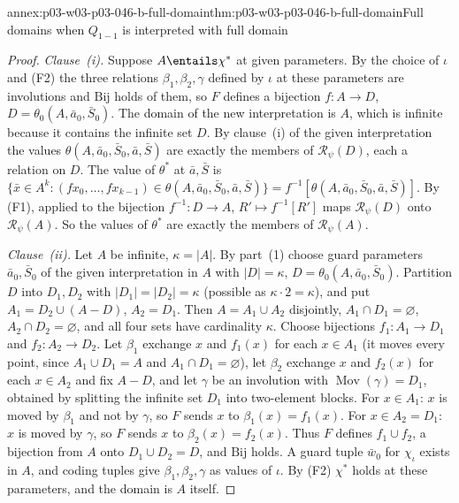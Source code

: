 \begin{annexitem}{annex:p03-w03-p03-046-b-full-domain}{thm:p03-w03-p03-046-b-full-domain}{Full domains when \(Q_{1-1}\) is interpreted with full domain}
\begin{proof}
\emph{Clause~(i).} Suppose \(A\entails\chi^*\) at given parameters. By
the choice of \(\iota\) and (F2) the three relations
\(\beta_1,\beta_2,\gamma\) defined by \(\iota\) at these parameters are
involutions and \(\mathrm{Bij}\) holds of them, so \(F\) defines a bijection
\(f\colon A\to D\), \(D=\theta_0(A,\bar a_0,\bar S_0)\). The domain of the
new interpretation is \(A\), which is infinite because it contains the
infinite set \(D\). By clause~(i) of the given interpretation the values
\(\theta(A,\bar a_0,\bar S_0,\bar a,\bar S)\) are exactly the members of
\(\mathscr R_\psi(D)\), each a relation on \(D\). The value of
\(\theta^*\) at \(\bar a,\bar S\) is
\(\{\bar x\in A^k:(fx_0,\dots,fx_{k-1})\in\theta(A,\bar a_0,\bar S_0,\bar
a,\bar S)\}=f^{-1}[\theta(A,\bar a_0,\bar S_0,\bar a,\bar S)]\). By (F1),
applied to the bijection \(f^{-1}\colon D\to A\), \(R'\mapsto f^{-1}[R']\)
maps \(\mathscr R_\psi(D)\) onto \(\mathscr R_\psi(A)\). So the values of
\(\theta^*\) are exactly the members of \(\mathscr R_\psi(A)\).

\emph{Clause~(ii).} Let \(A\) be infinite, \(\kappa=|A|\). By part~(1)
choose guard parameters \(\bar a_0,\bar S_0\) of the given interpretation
in \(A\) with \(|D|=\kappa\), \(D=\theta_0(A,\bar a_0,\bar S_0)\).
Partition \(D\) into \(D_1,D_2\) with \(|D_1|=|D_2|=\kappa\) (possible as
\(\kappa\cdot2=\kappa\)), and put \(A_1=D_2\cup(A-D)\), \(A_2=D_1\). Then
\(A=A_1\cup A_2\) disjointly, \(A_1\cap D_1=\varnothing\),
\(A_2\cap D_2=\varnothing\), and all four sets have cardinality \(\kappa\).
Choose bijections \(f_1\colon A_1\to D_1\) and \(f_2\colon A_2\to D_2\). Let
\(\beta_1\) exchange \(x\) and \(f_1(x)\) for each \(x\in A_1\) (it moves
every point, since \(A_1\cup D_1=A\) and \(A_1\cap D_1=\varnothing\)), let
\(\beta_2\) exchange \(x\) and \(f_2(x)\) for each \(x\in A_2\) and fix
\(A-D\), and let \(\gamma\) be an involution with
\(\operatorname{Mov}(\gamma)=D_1\), obtained by splitting the infinite set
\(D_1\) into two-element blocks. For \(x\in A_1\): \(x\) is moved by
\(\beta_1\) and not by \(\gamma\), so \(F\) sends \(x\) to
\(\beta_1(x)=f_1(x)\). For \(x\in A_2=D_1\): \(x\) is moved by \(\gamma\),
so \(F\) sends \(x\) to \(\beta_2(x)=f_2(x)\). Thus \(F\) defines
\(f_1\cup f_2\), a bijection from \(A\) onto \(D_1\cup D_2=D\), and
\(\mathrm{Bij}\) holds. A guard tuple \(\bar w_0\) for \(\chi_\iota\) exists
in \(A\), and coding tuples give \(\beta_1,\beta_2,\gamma\) as values of
\(\iota\). By (F2) \(\chi^*\) holds at these parameters, and the domain is
\(A\) itself.
\end{proof}
\end{annexitem}

